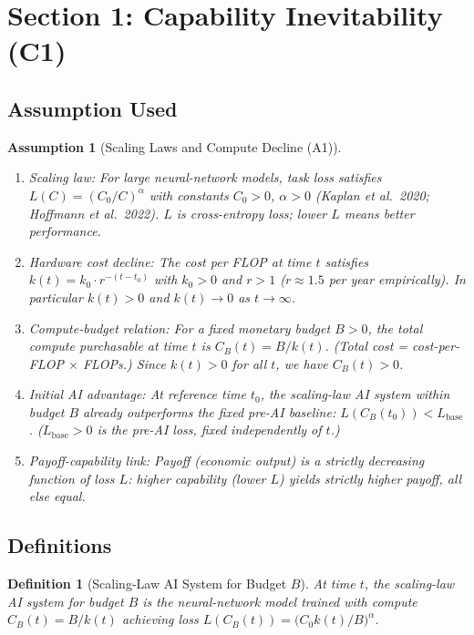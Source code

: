\documentclass[12pt]{article}
\newtheorem{assumption}{Assumption}
\newtheorem{definition}{Definition}
\begin{document}
\section*{Section 1: Capability Inevitability (C1)}

\subsection*{Assumption Used}

\begin{assumption}[Scaling Laws and Compute Decline (A1)]\label{A1}
  \begin{enumerate}
    \item \emph{Scaling law:} For large neural-network models, task loss
      satisfies $L(C) = (C_0/C)^{\alpha}$ with constants $C_0 > 0$,
      $\alpha > 0$ (Kaplan et al.\ 2020; Hoffmann et al.\ 2022).
      $L$ is cross-entropy loss; lower $L$ means better performance.
    \item \emph{Hardware cost decline:} The cost per FLOP at time $t$
      satisfies $k(t) = k_0 \cdot r^{-(t-t_0)}$ with $k_0 > 0$ and
      $r > 1$ ($r \approx 1.5$ per year empirically).
      In particular $k(t) > 0$ and $k(t) \to 0$ as $t \to \infty$.
    \item \emph{Compute-budget relation:} For a fixed monetary budget
      $B > 0$, the total compute purchasable at time $t$ is
      $C_B(t) = B / k(t)$.  (Total cost = cost-per-FLOP $\times$ FLOPs.)
      Since $k(t) > 0$ for all $t$, we have $C_B(t) > 0$.
    \item \emph{Initial AI advantage:} At reference time $t_0$, the
      scaling-law AI system within budget $B$ already outperforms the
      fixed pre-AI baseline:
      $L(C_B(t_0)) < L_{\mathrm{base}}$.
      ($L_{\mathrm{base}} > 0$ is the pre-AI loss, fixed independently
      of $t$.)
    \item \emph{Payoff-capability link:} Payoff (economic output) is a
      strictly decreasing function of loss $L$: higher capability
      (lower $L$) yields strictly higher payoff, all else equal.
  \end{enumerate}
\end{assumption}

\subsection*{Definitions}

\begin{definition}[Scaling-Law AI System for Budget $B$]
  At time $t$, the \emph{scaling-law AI system for budget $B$} is the
  neural-network model trained with compute $C_B(t) = B/k(t)$ achieving
  loss $L(C_B(t)) = \bigl(C_0 k(t)/B\bigr)^{\alpha}$.
\end{definition}
\end{document}
